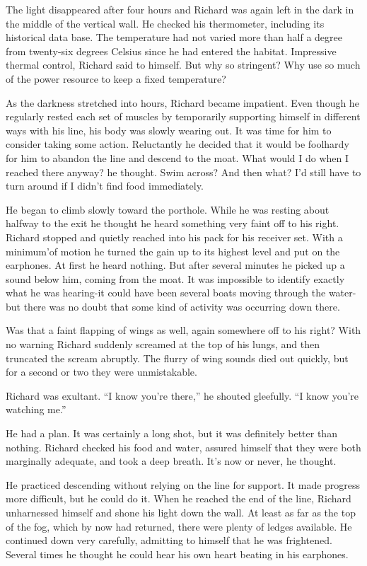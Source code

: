 \documentclass[]{article}
\begin{document}
{The light disappeared after four hours and Richard was again left in the dark in the middle of the vertical wall. He checked his thermometer, including its historical data base. The temperature had not varied more than half a degree from twenty-six degrees Celsius since he had entered the habitat. Impressive thermal control, Richard said to himself. But why so stringent? Why use so much of the power resource to keep a fixed temperature?

As the darkness stretched into hours, Richard became impatient. Even though he regularly rested each set of muscles by temporarily supporting himself in different ways with his line, his body was slowly wearing out. It was time for him to consider taking some action. Reluctantly he decided that it would be foolhardy for him to abandon the line and descend to the moat. What would I do when I reached there anyway? he thought. Swim across? And then what? I’d still have to turn around if I didn’t find food immediately.

He began to climb slowly toward the porthole. While he was resting about halfway to the exit he thought he heard something very faint off to his right. Richard stopped and quietly reached into his pack for his receiver set. With a minimum’of motion he turned the gain up to its highest level and put on the earphones. At first he heard nothing. But after several minutes he picked up a sound below him, coming from the moat. It was impossible to identify exactly what he was hearing-it could have been several boats moving through the water-but there was no doubt that some kind of activity was occurring down there.

Was that a faint flapping of wings as well, again somewhere off to his right? With no warning Richard suddenly screamed at the top of his lungs, and then truncated the scream abruptly. The flurry of wing sounds died out quickly, but for a second or two they were unmistakable.

Richard was exultant. “I know you’re there,” he shouted gleefully. “I know you’re watching me.”

He had a plan. It was certainly a long shot, but it was definitely better than nothing. Richard checked his food and water, assured himself that they were both marginally adequate, and took a deep breath. It’s now or never, he thought.

He practiced descending without relying on the line for support. It made progress more difficult, but he could do it. When he reached the end of the line, Richard unharnessed himself and shone his light down the wall. At least as far as the top of the fog, which by now had returned, there were plenty of ledges available. He continued down very carefully, admitting to himself that he was frightened. Several times he thought he could hear his own heart beating in his earphones.

}
\end{document}
